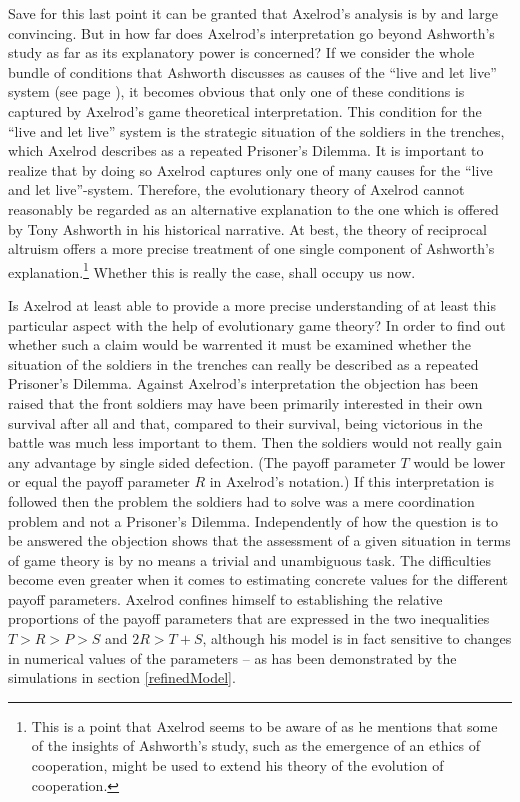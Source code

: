 Save for this last point it can be granted that Axelrod's analysis is by
and large convincing.
But in how far does Axelrod's interpretation go beyond Ashworth's study as far
as its explanatory power is concerned? If we consider the whole bundle of
conditions that Ashworth discusses as causes of the ``live and let live''
system (see page \pageref{liveAndLetLive}), it becomes obvious that only one
of these conditions is captured by Axelrod's game theoretical interpretation.
This condition for the ``live and let live'' system is the strategic situation
of the soldiers in the trenches, which Axelrod describes as a repeated
Prisoner's Dilemma. It is important to realize that by doing so Axelrod
captures only one of many causes for the ``live and let live''-system.
Therefore, the evolutionary theory of Axelrod cannot reasonably be regarded as
an alternative explanation to the one which is offered by Tony Ashworth in his
historical narrative. At best, the theory of reciprocal altruism offers a more
precise treatment of one single component of Ashworth's
explanation.\footnote{This is
  a point that Axelrod seems to be aware of as he mentions that some of the
  insights of Ashworth's study, such as the emergence of an ethics of
  cooperation, might be used to extend his theory of the evolution of
  cooperation.} Whether this is really the
case, shall occupy us now.

Is Axelrod at least able to provide a more precise understanding of
at least this particular aspect with the help of evolutionary game
theory? In order to find out whether such a claim would be warrented it
must be examined whether the situation of the soldiers in
the trenches can really be described as a repeated
Prisoner's Dilemma. Against Axelrod's interpretation the objection has
been raised that the front soldiers may have been primarily interested
in their own survival after all and that, compared to their survival,
being victorious in the battle was much less important to them. Then the
soldiers would not really gain any advantage by single sided defection.
(The payoff parameter $T$ would be lower or equal the payoff
parameter $R$ in Axelrod's notation.) If this interpretation is followed
then the problem the soldiers had to solve was a mere coordination
problem and not a Prisoner's Dilemma. Independently of how the question
is to be answered the objection shows that the assessment of a
given situation in terms of game theory is by no means a trivial and
unambiguous task. The difficulties become even greater when it comes to
estimating concrete values for the different payoff parameters. Axelrod
confines himself to establishing the relative proportions of the payoff
parameters that are expressed in the two inequalities $T > R > P > S$ and
$2R > T+S$, although his model is in fact sensitive to changes in
numerical values of the parameters -- as has been demonstrated by the
simulations in section \ref{refinedModel}.

